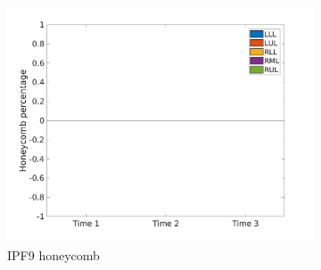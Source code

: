 \begin{figure}[H]
\begin{subfigure}{.46\linewidth}
  \includegraphics[width=\linewidth,trim={{.0\wd0} {.0\wd0} {.0\wd0} {.0\wd0}},clip]{Appendix/Image_AppexA/LobarDistribution/IPF9HoneycombLobarRegionDiseaseDistributionOverTime.jpg} %
  \caption{IPF9 honeycomb}
  \label{fig:IPF9LobarRegionDiseaseDistributionOverTime-c} 
\end{subfigure} 
\hspace{.3in}
\begin{subfigure}{.46\linewidth}%

\end{subfigure}
\end{figure}
